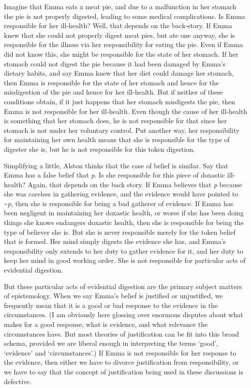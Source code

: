 Imagine that Emma eats a meat pie, and due to a malfunction in her stomach the pie is not properly digested, leading to some medical complications. Is Emma responsible for her ill-health? Well, that depends on the back-story. If Emma knew that she could not properly digest meat pies, but ate one anyway, she is responsible for the illness via her responsibility for eating the pie. Even if Emma did not know this, she might be responsible for the state of her stomach. If her stomach could not digest the pie because it had been damaged by Emma's dietary habits, and say Emma knew that her diet could damage her stomach, then Emma is responsible for the state of her stomach and hence for the misdigestion of the pie and hence for her ill-health. But if neither of these conditions obtain, if it just happens that her stomach misdigests the pie, then Emma is not responsible for her ill-health. Even though the cause of her ill-health is something that her stomach does, he is not responsible for that since her stomach is not under her voluntary control. Put another way, her responsibility for maintaining her own health means that she is responsible for the type of digester she is, but he is not responsible for this token digestion.

Simplifying a little, Alston thinks that the case of belief is similar. Say that Emma has a false belief that \textit{p}. Is she responsible for this piece of doxastic ill-health? Again, that depends on the back story. If Emma believes that \textit{p} because she was careless in gathering evidence, and the evidence would have pointed to \~{}\textit{p}, then she is responsible for being a bad gatherer of evidence. If Emma has been negligent in maintaining her doxastic health, or worse if she has been doing things she knows endangers doxastic health, then she is responsible for being the type of believer she is. But she is never responsible merely for the token belief that is formed. Her mind simply digests the evidence she has, and Emma's responsibility only extends to her duty to gather evidence for it, and her duty to keep her mind in good working order. She is not responsible for particular acts of evidential digestion. 

But these particular acts of evidential digestion are the primary subject matters of epistemology. When we say Emma's belief is justified or unjustified, we frequently mean that it is a good or bad response to the evidence in the circumstances. (I am obviously here glossing over enormous disputes about what makes for a good response, what is evidence, and what relevance the circumstances have. But most theories of justification can be fit into this broad schema, provided we are liberal enough in interpreting the terms `good', `evidence' and `circumstances'.) If Emma is not responsible for her response to the evidence, then either we have to divorce justification from responsibility, or we have to say that the concept of justification being used in these discussions is defective.

